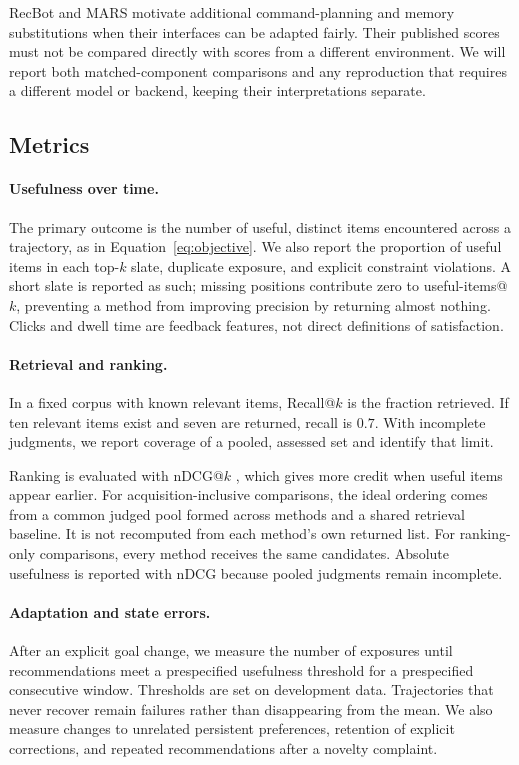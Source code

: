 \documentclass[11pt]{article}
\begin{document}
RecBot and MARS motivate additional command-planning and memory substitutions when their interfaces can be adapted fairly. Their published scores must not be compared directly with scores from a different environment. We will report both matched-component comparisons and any reproduction that requires a different model or backend, keeping their interpretations separate.

\subsection{Metrics}

\paragraph{Usefulness over time.}
The primary outcome is the number of useful, distinct items encountered across a trajectory, as in Equation~\ref{eq:objective}. We also report the proportion of useful items in each top-$k$ slate, duplicate exposure, and explicit constraint violations. A short slate is reported as such; missing positions contribute zero to useful-items@$k$, preventing a method from improving precision by returning almost nothing. Clicks and dwell time are feedback features, not direct definitions of satisfaction.

\paragraph{Retrieval and ranking.}
In a fixed corpus with known relevant items, Recall@$k$ is the fraction retrieved. If ten relevant items exist and seven are returned, recall is $0.7$. With incomplete judgments, we report coverage of a pooled, assessed set and identify that limit.

Ranking is evaluated with nDCG@$k$ \citep{jarvelin2002cumulated}, which gives more credit when useful items appear earlier. For acquisition-inclusive comparisons, the ideal ordering comes from a common judged pool formed across methods and a shared retrieval baseline. It is not recomputed from each method's own returned list. For ranking-only comparisons, every method receives the same candidates. Absolute usefulness is reported with nDCG because pooled judgments remain incomplete.

\paragraph{Adaptation and state errors.}
After an explicit goal change, we measure the number of exposures until recommendations meet a prespecified usefulness threshold for a prespecified consecutive window. Thresholds are set on development data. Trajectories that never recover remain failures rather than disappearing from the mean. We also measure changes to unrelated persistent preferences, retention of explicit corrections, and repeated recommendations after a novelty complaint.
\end{document}
